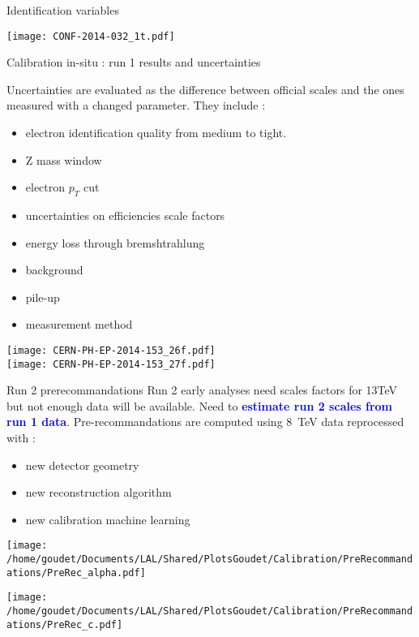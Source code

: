 \begin{frame}{Identification variables}
  \begin{center}
\texttt{[image: CONF-2014-032\_1t.pdf]}
\end{center}
\end{frame}

\begin{frame}{Calibration in-situ : run 1  results and uncertainties}
\begin{minipage}{0.64\linewidth}
  Uncertainties are evaluated as the difference between official scales and the ones measured with a changed parameter. 
  They include :
  \begin{itemize}
  \item electron identification quality from medium to tight.
  \item Z mass window 
  \item electron $p_T$ cut
  \item uncertainties on efficiencies scale factors
  \item energy loss through bremshtrahlung
  \item background
  \item pile-up
  \item measurement method
  \end{itemize}
\end{minipage}
\begin{minipage}{0.35\linewidth}
    \texttt{[image: CERN-PH-EP-2014-153\_26f.pdf]}\\
    \texttt{[image: CERN-PH-EP-2014-153\_27f.pdf]}
\end{minipage}
\end{frame}

\begin{frame}{Run 2 prerecommandations}
Run 2 early analyses need scales factors for 13TeV but not enough data will be available.
Need to \textcolor{blue}{ \bf estimate run 2 scales from run 1 data}.
\newline
Pre-recommandations are computed using $8$~TeV data reprocessed with :
\begin{itemize}
\item new detector geometry
\item new reconstruction algorithm
\item new calibration machine learning
\end{itemize} 
  \begin{minipage}{0.49\linewidth}
    \texttt{[image: /home/goudet/Documents/LAL/Shared/PlotsGoudet/Calibration/PreRecommandations/PreRec\_alpha.pdf]}
  \end{minipage}
  \begin{minipage}{0.49\linewidth}
    \texttt{[image: /home/goudet/Documents/LAL/Shared/PlotsGoudet/Calibration/PreRecommandations/PreRec\_c.pdf]}
  \end{minipage}
\end{frame}


